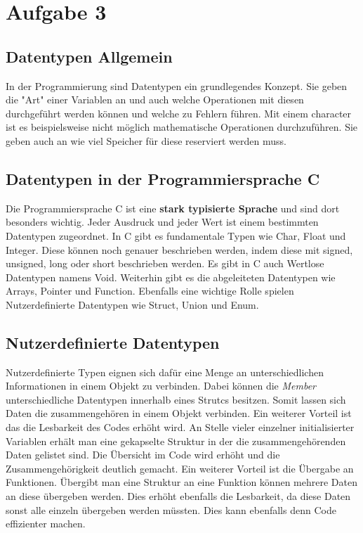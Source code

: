 \chapter{Aufgabe 3}
\section{Datentypen Allgemein}
In der Programmierung sind Datentypen ein grundlegendes Konzept. Sie geben die "Art" einer Variablen an und auch welche Operationen mit diesen durchgeführt werden können und welche zu Fehlern führen. Mit einem character ist es beispielsweise nicht möglich mathematische Operationen durchzuführen. Sie geben auch an wie viel Speicher für diese reserviert werden muss. 

\section{Datentypen in der Programmiersprache C}
Die Programmiersprache C ist eine \textbf{stark typisierte Sprache} und sind dort besonders wichtig. Jeder Ausdruck und jeder Wert ist einem bestimmten Datentypen zugeordnet.
In C gibt es fundamentale Typen wie Char, Float und Integer. Diese können noch genauer beschrieben werden, indem diese mit signed, unsigned, long oder short beschrieben werden. Es gibt in C auch Wertlose Datentypen namens Void. Weiterhin gibt es die abgeleiteten Datentypen wie Arrays, Pointer und Function. Ebenfalls eine wichtige Rolle spielen Nutzerdefinierte Datentypen wie Struct, Union und Enum.

\section{Nutzerdefinierte Datentypen}
Nutzerdefinierte Typen eignen sich dafür eine Menge an unterschiedlichen Informationen in einem Objekt zu verbinden. Dabei können die \textit{Member} unterschiedliche Datentypen innerhalb eines Strutcs besitzen. Somit lassen sich Daten die zusammengehören in einem Objekt verbinden. Ein weiterer Vorteil ist das die Lesbarkeit des Codes erhöht wird. An Stelle vieler einzelner initialisierter Variablen erhält man eine gekapselte Struktur in der die zusammengehörenden Daten gelistet sind. Die Übersicht im Code wird erhöht und die Zusammengehörigkeit deutlich gemacht. Ein weiterer Vorteil ist die Übergabe an Funktionen. Übergibt man eine Struktur an eine Funktion können mehrere Daten an diese übergeben werden. Dies erhöht ebenfalls die Lesbarkeit, da diese Daten sonst alle einzeln übergeben werden müssten. Dies kann ebenfalls denn Code effizienter machen.

